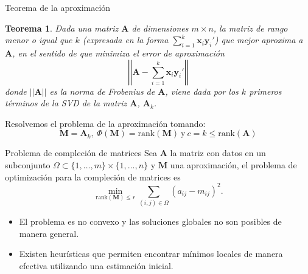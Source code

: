 \documentclass{beamer}
\newtheorem{teor}{Teorema}[section]
\newcommand{\normleft}{\left|\left|}
\newcommand{\normright}{\right|\right|}
\begin{document}
\begin{frame}{Teorema de la aproximación}
\begin{teor}
    Dada una matriz $\mathbf{A}$ de dimensiones $m \times n$, la matriz de rango menor o igual que $k$ (expresada en la forma $\sum_{i=1}^{k} \mathbf{x}_i \mathbf{y}_i'$)
    que mejor aproxima a $\mathbf{A}$, en el sentido de que minimiza el error de aproximación
    \begin{equation*}
        \normleft \mathbf{A} -  \sum_{i=1}^{k} \mathbf{x}_i \mathbf{y}_i' \normright
    \end{equation*}
    donde $\normleft \mathbf{A} \normright$ es la norma de Frobenius de $\mathbf{A}$, viene dada por los $k$ primeros términos de la SVD de la matriz $\mathbf{A}$, $\mathbf{A}_k$.
\end{teor}

Resolvemos el problema de la aproximación tomando:
\begin{equation*}
    \mathbf{M} = \mathbf{A}_k,\  \Phi(\mathbf{M}) = \mbox{rank}(\mathbf{M}) \mathrm{\ y\ } c = k \leq \mbox{rank}(\mathbf{A})
\end{equation*}
\end{frame}

\begin{frame}{Problema de compleción de matrices}
Sea $\mathbf{A}$ la matriz con datos en un subconjunto $\Omega \subset \{1, \ldots, m\} \times \{1, \ldots, n\}$ y $\textbf{M}$ una aproximación,  el problema de optimización para la compleción de matrices es
\begin{equation*}
    \min_{\mbox{rank}(\mathbf{M}) \leq r} \sum_{(i,j) \in \Omega} (a_{ij} -  m_{ij})^2.
\end{equation*}
\begin{itemize}
    \item El problema es no convexo y las soluciones globales no son posibles de manera general.
    \item Existen heurísticas que permiten encontrar mínimos locales de manera efectiva utilizando una estimación inicial.
\end{itemize}
    
\end{frame}
\end{document}
